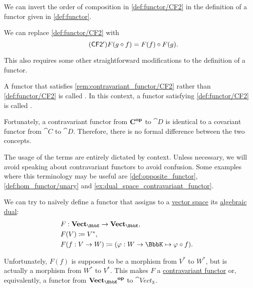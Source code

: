 \begin{remark}\label{rem:contravariant_functor}
  We can invert the order of composition in \ref{def:functor/CF2} in the definition of a functor given in \cref{def:functor}.
  \begin{thmenum}
     We can replace \ref{def:functor/CF2} with
    \begin{equation}\label{eq:rem:contravariant_functor/CF2}\tag{\logic{CF2\Textprime}}
      F(g \bincirc f) = F(f) \bincirc F(g).
    \end{equation}
  \end{thmenum}

  This also requires some other straightforward modifications to the definition of a functor.

  A functor that satisfies \ref{rem:contravariant_functor/CF2} rather than \ref{def:functor/CF2} is called . In this context, a functor satisfying \ref{def:functor/CF2} is called .

  Fortunately, a contravariant functor from \( \cat{C}^\oppos \) to \( \cat{D} \) is identical to a covariant functor from \( \cat{C} \) to \( \cat{D} \). Therefore, there is no formal difference between the two concepts.

  The usage of the terms are entirely dictated by context. Unless necessary, we will avoid speaking about contravariant functors to avoid confusion. Some examples where this terminology may be useful are \cref{def:opposite_functor}, \cref{def:hom_functor/unary} and \cref{ex:dual_space_contravariant_functor}.
\end{remark}

\begin{example}\label{ex:dual_space_contravariant_functor}
  We can try to na\"ively define a functor that assigns to a \hyperref[def:vector_space]{vector space} its \hyperref[def:dual_vector_space]{algebraic dual}:
  \begin{equation*}
    \begin{aligned}
      &F: \cat{Vect_\BbbK} \to \cat{Vect_\BbbK}, \\
      &F(V) \coloneqq V^*, \\
      &F(f: V \to W) \coloneqq (\varphi: W \to \BbbK \mapsto \varphi \bincirc f).
    \end{aligned}
  \end{equation*}

  Unfortunately, \( F(f) \) is supposed to be a morphism from \( V^* \) to \( W^* \), but is actually a morphism from \( W^* \) to \( V^* \). This makes \( F \) a \hyperref[rem:contravariant_functor]{contravariant functor} or, equivalently, a functor from \( \cat{Vect_\BbbK}^\oppos \) to \( \cat{Vect_\BbbK} \).
\end{example}

